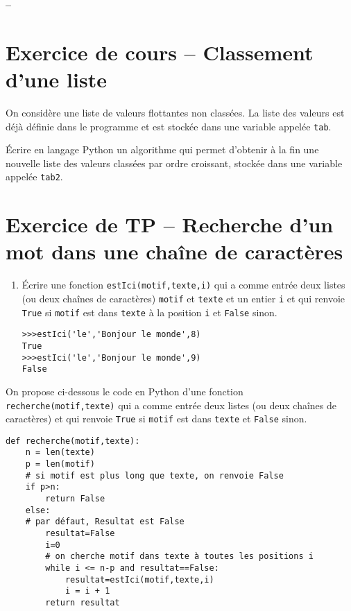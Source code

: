 





\begin{center}
{\Large\bf {\type} \no {\num} -- \descrip}
\end{center}


\section{Exercice de cours -- Classement d'une liste}

On considère une liste de valeurs flottantes non classées. La liste des valeurs est déjà définie dans le programme et est stockée dans une variable appelée \texttt{tab}.

Écrire en langage Python un algorithme qui permet d'obtenir à la fin une nouvelle liste des valeurs classées par ordre croissant, stockée dans une variable appelée \texttt{tab2}.

\section{Exercice de TP -- Recherche d'un mot dans une cha\^ ine de caract\` eres}
\begin{enumerate}
\item Écrire une fonction \verb?estIci(motif,texte,i)? qui a comme entr\' ee deux listes (ou deux cha\^ ines de caract\` eres) \verb?motif? et \verb?texte? et un entier \verb?i? et qui renvoie \verb?True? si \verb?motif? est dans \verb?texte? \` a la position \verb?i? et \verb?False? sinon.
\begin{verbatim}
>>>estIci('le','Bonjour le monde',8)
True
>>>estIci('le','Bonjour le monde',9)
False
\end{verbatim} 
\end{enumerate}

On propose ci-dessous le code en Python d'une fonction \verb?recherche(motif,texte)? qui a comme entr\' ee deux listes (ou deux cha\^ ines de caract\` eres) et qui renvoie \verb?True? si \verb?motif? est dans \verb?texte? et \verb?False? sinon.

\begin{verbatim}
def recherche(motif,texte):
    n = len(texte)
    p = len(motif)
    # si motif est plus long que texte, on renvoie False
    if p>n:
        return False
    else:
    # par défaut, Resultat est False
        resultat=False
        i=0
        # on cherche motif dans texte à toutes les positions i 
        while i <= n-p and resultat==False:
            resultat=estIci(motif,texte,i)
            i = i + 1
        return resultat           
\end{verbatim}

